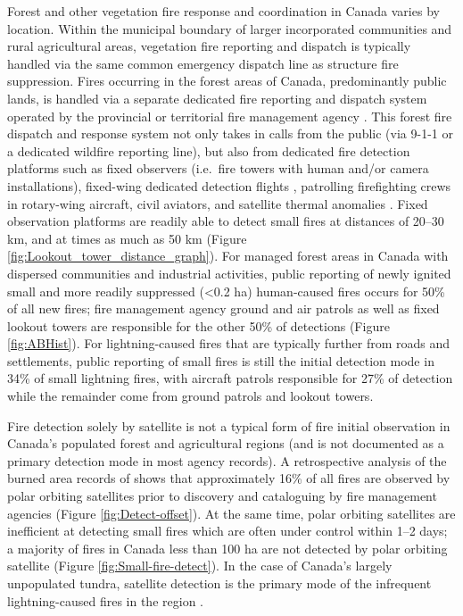 \documentclass[fire,article,submit,moreauthors]{mdpi}
\begin{document}
Forest and other vegetation fire response and coordination in Canada
varies by location. Within the municipal boundary of larger incorporated
communities and rural agricultural areas, vegetation fire reporting and
dispatch is typically handled via the same common emergency dispatch
line as structure fire suppression. Fires occurring in the forest areas
of Canada, predominantly public lands, is handled via a separate
dedicated fire reporting and dispatch system operated by the provincial
or territorial fire management agency
\citep{tymstraWildfireManagementCanada2019}. This forest fire dispatch
and response system not only takes in calls from the public (via 9-1-1
or a dedicated wildfire reporting line), but also from dedicated fire
detection platforms such as fixed observers (i.e.~fire towers with human
and/or camera installations), fixed-wing dedicated detection flights
\citep{mcfaydenRiskAssessmentWildland2019}, patrolling firefighting
crews in rotary-wing aircraft, civil aviators, and satellite thermal
anomalies \citep{johnstonSatelliteDetectionLimitations2018}. Fixed
observation platforms are readily able to detect small fires at
distances of 20--30 km, and at times as much as 50 km (Figure
\ref{fig:Lookout_tower_distance_graph}). For managed forest areas in
Canada with dispersed communities and industrial activities, public
reporting of newly ignited small and more readily suppressed
(\textless0.2 ha) human-caused fires occurs for 50\% of all new fires;
fire management agency ground and air patrols as well as fixed lookout
towers are responsible for the other 50\% of detections (Figure
\ref{fig:ABHist}). For lightning-caused fires that are typically further
from roads and settlements, public reporting of small fires is still the
initial detection mode in 34\% of small lightning fires, with aircraft
patrols responsible for 27\% of detection while the remainder come from
ground patrols and lookout towers.

Fire detection solely by satellite is not a typical form of fire initial
observation in Canada's populated forest and agricultural regions (and
is not documented as a primary detection mode in most agency records). A
retrospective analysis of the burned area records of \citet{skakun2022}
shows that approximately 16\% of all fires are observed by polar
orbiting satellites prior to discovery and cataloguing by fire
management agencies (Figure \ref{fig:Detect-offset}). At the same time,
polar orbiting satellites are inefficient at detecting small fires which
are often under control within 1--2 days; a majority of fires in Canada
less than 100 ha are not detected by polar orbiting satellite (Figure
\ref{fig:Small-fire-detect}). In the case of Canada's largely
unpopulated tundra, satellite detection is the primary mode of the
infrequent lightning-caused fires in the region \citep{hethcoat2024}.
\end{document}
